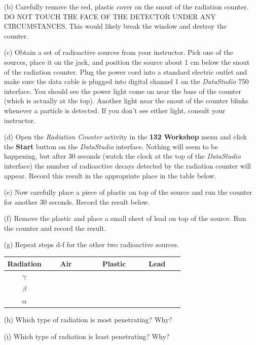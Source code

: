 (b) Carefully remove the red, plastic cover on the snout of the radiation counter.
DO NOT TOUCH THE FACE OF THE DETECTOR UNDER ANY CIRCUMSTANCES. This would likely
break the window and destroy the counter.

(c) Obtain a set of radioactive sources from your instructor.
Pick one of the sources, place it on the jack, and position the source about 1 cm below
the snout of the radiation counter.
Plug the power cord into a standard electric outlet and make sure the data cable is plugged
into digital channel 1 on the {\it DataStudio} 750 interface.
You should see the power light come on near the base of the counter (which is actually at the
top).
Another light near the snout of the counter blinks whenever a particle
is detected.
If you don't see either light, consult your instructor.

(d) Open the {\it Radiation Counter} activity in the {\bf 132 Workshop} menu and click
the {\bf Start} button on the {\it DataStudio} interface.
Nothing will seem to be happening, but after 30 seconds (watch the clock at the top
of the {\it DataStudio} interface) the number of radioactive decays detected by the 
radiation counter will appear.
Record this result in the appropriate place in the table below.

(e) Now carefully place a piece of plastic on top of the source and run the
counter for another 30 seconds. Record the result below.

(f) Remove the plastic and place a small sheet of lead on top of the source.
Run the counter and record the result.

(g) Repeat steps d-f for the other two radioactive sources.


\vspace{0.3cm}
{\centering \begin{tabular}{|c|c|c|c|}
\hline 
Radiation&
~~~Air~~~~&
~~Plastic~&
~~~Lead~~~\\
\hline
\hline 
\( \gamma \)&
&
&
\\
\hline 
\( \beta \)&
&
&
\\
\hline 
\( \alpha \)&
&
&
\\
\hline
\end{tabular}\par}
\vspace{0.3cm}

(h) Which type of radiation is most penetrating? Why?
\vspace{15mm}

(i) Which type of radiation is least penetrating? Why?
\vspace{15mm}

